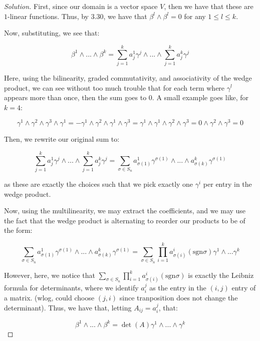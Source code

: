 \documentclass[10pt]{article}
\begin{document}
\begin{proof}[Solution]

First, since our domain is a vector space $V$, then we have that these are $1$-linear functions. Thus, by 3.30, we have that $\beta^l \wedge \beta^l = 0$ for any $1 \leq l \leq k$.

Now, substituting, we see that:

$$ \beta^1 \wedge ... \wedge \beta^k = \sum_{j=1}^k a_j^1 \gamma^j \wedge ... \wedge \sum_{j=1}^k a_j^k \gamma^j $$

Here, using the bilinearity, graded commutativity, and associativity of the wedge product, we can see without too much trouble that for each term where $\gamma^l$ appears more than once, then the sum goes to 0. A small example goes like, for $k = 4$:

$$ \gamma^1 \wedge \gamma^2 \wedge \gamma^3 \wedge \gamma^1 = -  \gamma^1 \wedge \gamma^2 \wedge \gamma^1 \wedge \gamma^3 =  \gamma^1 \wedge \gamma^1 \wedge \gamma^2 \wedge \gamma^3 = 0 \wedge \gamma^2 \wedge \gamma^3 = 0$$

Then, we rewrite our original sum to:

$$ \sum_{j=1}^k a_j^1 \gamma^j \wedge ... \wedge \sum_{j=1}^k a_j^k \gamma^j = \sum_{\sigma \in S_n}  a_{\sigma(1)}^1 \gamma^{\sigma(1)} \wedge ... \wedge a_{\sigma(k)}^k \gamma^{\sigma(1)} $$ 

as these are exactly the choices such that we pick exactly one $\gamma^i$ per entry in the wedge product.

Now, using the multilinearity, we may extract the coefficients, and we may use the fact that the wedge product is alternating to reorder our products to be of the form:

$$ \sum_{\sigma \in S_n}  a_{\sigma(1)}^1 \gamma^{\sigma(1)} \wedge ... \wedge a_{\sigma(k)}^k \gamma^{\sigma(1)} = \sum_{\sigma \in S_n} \prod_{i=1}^k a_{\sigma(i)}^i (\text{sgn} \sigma) \gamma^1 \wedge ... \gamma^k  $$

However, here, we notice that $ \sum_{\sigma \in S_n} \prod_{i=1}^k a_{\sigma(i)}^i (\text{sgn} \sigma)$ is exactly the Leibniz formula for determinants, where we identify $a_i^j$ as the entry in the $(i,j)$ entry of a matrix. (wlog, could choose $(j,i)$ since tranposition does not change the determinant). Thus, we have that, letting $A_{ij} = a_i^j$, that:

$$ \beta^1 \wedge ... \wedge \beta^k = \det(A) \gamma^1 \wedge ... \wedge \gamma^k$$

\end{proof}
\end{document}
